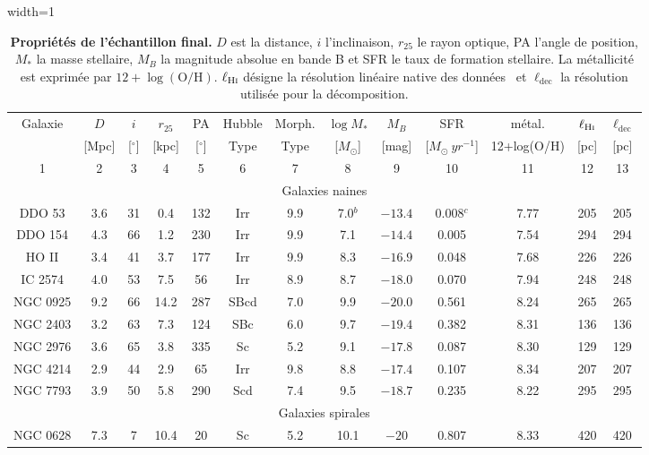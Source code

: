 \begin{table}[htbp]
	\centering
	\caption{\textbf{Propriétés de l'échantillon final.} $D$ est la distance, $i$ l'inclinaison, $r_{25}$ le rayon optique, PA l'angle de position, $M_*$ la masse stellaire, $M_B$ la magnitude absolue en bande B et SFR le taux de formation stellaire. La métallicité est exprimée par $12+\log(\mathrm{O/H})$. $\ell_{\textrm{H\textsc{i}}}$ désigne la résolution linéaire native des données \HI\ et $\ell_{\mathrm{dec}}$ la résolution utilisée pour la décomposition.}
	\begin{adjustbox}{width=1\textwidth}
		\begin{tabular}{|ccccccccccccc|}
			\hline\hline
			Galaxie & $D$ & $i$ & $r_{25}$ & PA & Hubble &Morph.& $\log M_*$ & $M_B$ & SFR &métal. & $\ell_{\textrm{H\textsc{i}}}$ & $\ell_{\mathrm{dec}}$ \\[-1pt]
			& [Mpc] & [$^\circ$] & [kpc] & [$^\circ$] & Type &Type& [$M_\odot$] & [mag]&[$M_{\odot}\ yr^{-1}$] &12+log(O/H) & [pc] & [pc] \\
			1 	&	2	&	3	&	4	&	5	&	6	&	7	&	8	&	9	&	10	&	11 & 12 & 13 \\
			\hline
			\multicolumn{13}{|c|}{\rule[-5pt]{0pt}{20pt}Galaxies naines} \\
			DDO 53 & 3.6 & 31 & 0.4 & 132 & Irr &9.9& 7.0$^b$ & $-13.4$ &0.008$^c$& 7.77 & 205 & 205 \\
			DDO 154 & 4.3 & 66 & 1.2 & 230 & Irr &9.9& 7.1 & $-14.4$ &0.005& 7.54 & 294 & 294 \\
			HO II & 3.4 & 41 & 3.7 & 177 & Irr &9.9& 8.3 & $-16.9$ &0.048& 7.68 & 226 & 226 \\
			IC 2574 & 4.0 & 53 & 7.5 & 56 & Irr &8.9& 8.7 & $-18.0$ &0.070& 7.94 & 248 & 248 \\
			NGC 0925 & 9.2 & 66 & 14.2 & 287 & SBcd &7.0& 9.9 & $-20.0$ &0.561& 8.24 & 265 & 265 \\
			NGC 2403 & 3.2 & 63 & 7.3 & 124 & SBc &6.0& 9.7 & $-19.4$ &0.382& 8.31 & 136 & 136 \\
			NGC 2976 & 3.6 & 65 & 3.8 & 335 & Sc &5.2& 9.1 & $-17.8$ &0.087& 8.30 & 129 & 129 \\
			NGC 4214 & 2.9 & 44 & 2.9 & 65 & Irr &9.8& 8.8 & $-17.4$ &0.107& 8.34 & 207 & 207 \\
			NGC 7793 & 3.9 & 50 & 5.8 & 290 & Scd &7.4& 9.5 & $-18.7$ &0.235& 8.22 & 295 & 295 \\
			\hline
			\multicolumn{13}{|c|}{\rule[-5pt]{0pt}{20pt}Galaxies spirales} \\
			NGC 0628 & 7.3 & 7 & 10.4 & 20 & Sc &5.2& 10.1 & $-20$ &0.807& 8.33 & 420 & 420 \\

\end{tabular}
\end{adjustbox}
\end{table}
